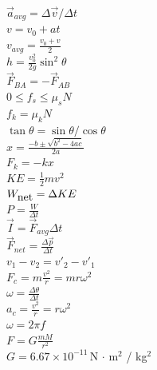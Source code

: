 \documentclass[letterpaper,addpoints,answers]{exam}
\begin{document}
\begin{multicols}{2}
 \noindent
 $\vec{a}_{avg} = \Delta\vec{v} / \Delta t$ \\
 $v = v_0 + a t$ \\
 $v_{avg} = \frac{v_0 + v}{2}$ \\
 $h = \frac{v_0^2}{2 g} \sin^2 \theta$ \\
 $\vec{F}_{BA} = - \vec{F}_{AB}$ \\
 $0 \le f_s \le \mu_s N$ \\
 $f_k = \mu_k N$ \\
 $\tan\theta = \sin\theta / \cos\theta$ \\
 $x = \frac{-b \pm \sqrt{b^2 - 4 a c}}{2 a}$ \\
 $F_k = -k x$ \\
 $KE = \frac{1}{2} m v^2$ \\
 $W_{\hbox{net}} = \Delta KE$ \\
 $P = \frac{W}{\Delta t}$ \\
 $\vec{I} = \vec{F}_{avg} \Delta t$ \\
 $\vec{F}_{net} = \frac{\Delta \vec{p}}{\Delta t}$ \\
 $v_1 - v_2 = v'_2 - v'_1$ \\
 $F_c = m\frac{v^2}{r} = m r \omega^2$ \\
 $\omega = \frac{\Delta \theta}{\Delta t}$ \\
 $a_c = \frac{v^2}{r} = r \omega^2$ \\
 $\omega = 2 \pi f$ \\
 $F = G \frac{m M}{r^2}$ \\
 $G = 6.67 \times 10^{-11}\,$N $\cdot$ m$^2$ / kg$^2$ \\
  
 \end{multicols}
\end{document}
